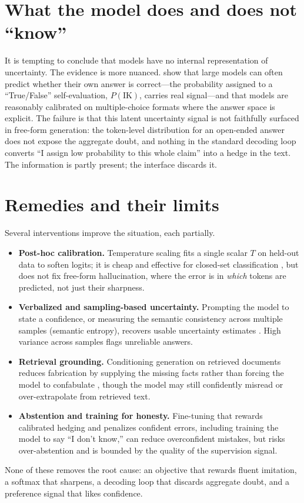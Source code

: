\documentclass[11pt]{article}
\begin{document}
\section{What the model does and does not ``know''}
It is tempting to conclude that models have no internal representation of uncertainty. The evidence is more nuanced. \citet{kadavath2022know} show that large models can often predict whether their own answer is correct---the probability assigned to a ``True/False'' self-evaluation, $P(\text{IK})$, carries real signal---and that models are reasonably calibrated on multiple-choice formats where the answer space is explicit. The failure is that this latent uncertainty signal is not faithfully surfaced in free-form generation: the token-level distribution for an open-ended answer does not expose the aggregate doubt, and nothing in the standard decoding loop converts ``I assign low probability to this whole claim'' into a hedge in the text. The information is partly present; the interface discards it.

\section{Remedies and their limits}
Several interventions improve the situation, each partially.
\begin{itemize}[leftmargin=*]
  \item \textbf{Post-hoc calibration.} Temperature scaling fits a single scalar $T$ on held-out data to soften logits; it is cheap and effective for closed-set classification \citep{guo2017calibration}, but does not fix free-form hallucination, where the error is in \emph{which} tokens are predicted, not just their sharpness.
  \item \textbf{Verbalized and sampling-based uncertainty.} Prompting the model to state a confidence, or measuring the semantic consistency across multiple samples (semantic entropy), recovers usable uncertainty estimates \citep{kuhn2023semantic,lin2022teaching}. High variance across samples flags unreliable answers.
  \item \textbf{Retrieval grounding.} Conditioning generation on retrieved documents reduces fabrication by supplying the missing facts rather than forcing the model to confabulate \citep{lewis2020retrieval}, though the model may still confidently misread or over-extrapolate from retrieved text.
  \item \textbf{Abstention and training for honesty.} Fine-tuning that rewards calibrated hedging and penalizes confident errors, including training the model to say ``I don't know,'' can reduce overconfident mistakes, but risks over-abstention and is bounded by the quality of the supervision signal.
\end{itemize}
None of these removes the root cause: an objective that rewards fluent imitation, a softmax that sharpens, a decoding loop that discards aggregate doubt, and a preference signal that likes confidence.
\end{document}
